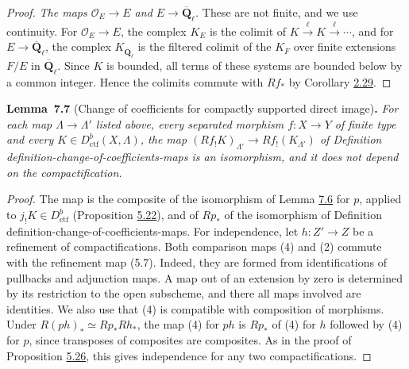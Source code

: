 \documentclass[11pt]{article}
\newenvironment{bpstatement}[2]{\par\addvspace{0.6\baselineskip}\noindent\textbf{#1}#2\textbf{.}\enspace\ignorespaces}
  {\par\addvspace{0.4\baselineskip}}
\newenvironment{bpstatementit}[2]{\begin{bpstatement}{#1}{#2}\itshape\ignorespaces}{\end{bpstatement}}
\begin{document}
\begin{proof}[{Proof}]
\emph{The maps \(\mathcal O_E\to E\) and \(E\to\overline{\mathbf Q}_\ell\).} These are not finite, and we use continuity. For \(\mathcal O_E\to E\), the complex \(K_E\) is the colimit of \(K\xrightarrow{\ell}K\xrightarrow{\ell}\cdots\), and for \(E\to\overline{\mathbf Q}_\ell\), the complex \(K_{\overline{\mathbf Q}_\ell}\) is the filtered colimit of the \(K_F\) over finite extensions \(F/E\) in \(\overline{\mathbf Q}_\ell\). Since \(K\) is bounded, all terms of these systems are bounded below by a common integer. Hence the colimits commute with \(Rf_*\) by Corollary \hyperref[bp86]{2.29}.
\end{proof}

\label{bp618}%
\begin{bpstatementit}{Lemma~7.7}{ (Change of coefficients for compactly supported direct image)}
For each map \(\Lambda\to\Lambda'\) listed above, every separated morphism \(f:X\to Y\) of finite type and every \(K\in D^b_{\mathrm{ctf}}(X,\Lambda)\), the map \((Rf_!K)_{\Lambda'}\to Rf_!(K_{\Lambda'})\) of Definition definition-change-of-coefficients-maps is an isomorphism, and it does not depend on the compactification.
\end{bpstatementit}

\begin{proof}[{Proof}]\label{bp619}%
The map is the composite of the isomorphism of Lemma \hyperref[bp616]{7.6} for \(p\), applied to \(j_!K\in D^b_{\mathrm{ctf}}\) (Proposition \hyperref[bp482]{5.22}), and of \(Rp_*\) of the isomorphism of Definition definition-change-of-coefficients-maps. For independence, let \(h:Z'\to Z\) be a refinement of compactifications. Both comparison maps (4) and (2) commute with the refinement map (5.7). Indeed, they are formed from identifications of pullbacks and adjunction maps. A map out of an extension by zero is determined by its restriction to the open subscheme, and there all maps involved are identities. We also use that (4) is compatible with composition of morphisms. Under \(R(ph)_*\simeq Rp_*Rh_*\), the map (4) for \(ph\) is \(Rp_*\) of (4) for \(h\) followed by (4) for \(p\), since transposes of composites are composites. As in the proof of Proposition \hyperref[bp492]{5.26}, this gives independence for any two compactifications.
\end{proof}
\end{document}
